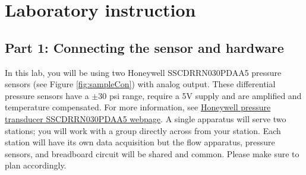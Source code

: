 \documentclass{article} %
\begin{document}
\section{Laboratory instruction}
\subsection{Part 1: Connecting the sensor and hardware}
In this lab, you will be using two Honeywell SSCDRRN030PDAA5 pressure sensors (see Figure \ref{fig:sampleCon}) with analog output. These differential pressure sensors have a $\pm$30 psi range, require a 5V supply and are amplified and temperature compensated. For more information, see \href{https://us.rs-online.com/product/honeywell/sscdrrn030pdaa5/70237501/?srsltid=AfmBOory4VnsN00xBr8yBZUDXfq7TsxGcRs9MxiVNRzgQ63wzcbJjC-c}{Honeywell pressure transducer SSCDRRN030PDAA5 webpage}.
A single apparatus will serve two stations; you will work with a group directly across from your station. Each station will have its own data acquisition but the flow apparatus, pressure sensors, and breadboard circuit will be  shared and common. Please make sure to plan accordingly.
\end{document}
